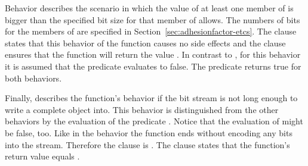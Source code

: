 Behavior  describes
the scenario in which the value of at least one
member of  is bigger than the specified
bit size for that member of
 allows.
The numbers of bits for the members of
 are specified in
Section~\ref{sec:adhesionfactor-etcs}.
The  clause states that this behavior
of the function causes no side effects and
the  clause ensures that the
function will return the value .
In contrast to ,
for this behavior it is assumed that the
 predicate evaluates
to false.
The 
predicate returns true for both behaviors.

Finally,  describes the function's
behavior if the bit stream is not long enough to
write a complete  object
into. 
This behavior is distinguished from the other
behaviors by the evaluation of the predicate
.
Notice that the evaluation of 
might be false, too.
Like in the  behavior the function
ends without encoding any bits into the stream.
Therefore the  clause is \inl{\\nothing}.
The  clause states that the function's
return value equals .

